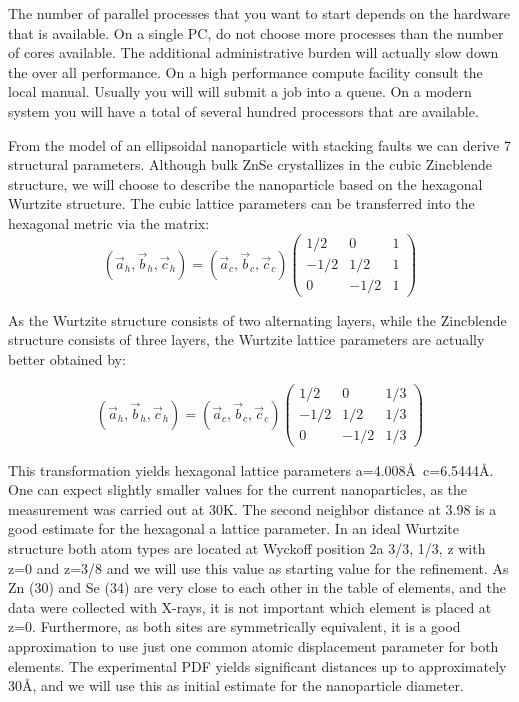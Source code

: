 The number of parallel processes that you want to start depends on the 
hardware that is available. On a single PC, do not choose more processes than
the number of cores available. The additional administrative burden will 
actually slow down the over all performance. On a high performance compute 
facility consult the local manual. Usually you will will submit a job into 
a queue. On a modern system you will have a total of several hundred 
processors that are available.

From the model of an ellipsoidal nanoparticle with stacking faults we can
derive 7 structural parameters. Although bulk ZnSe crystallizes in the
cubic Zincblende structure, we will choose to describe the nanoparticle 
based on the hexagonal Wurtzite structure. The cubic lattice parameters can
be transferred into the hexagonal metric via the matrix:
\begin{equation}
  ( \vec{a}_h, \vec{b}_h,\vec{c}_h ) = \left ( \vec{a}_c, \vec{b}_c, \vec{c}_c  \right )
   \left ( \begin{array}{rrr} 1/2 & 0   &1 \\ -1/2 &1/2 &1 \\ 0 &-1/2 &1 \end{array} \right )
\end{equation}

As the Wurtzite structure consists of two alternating layers, while the 
Zincblende structure consists of three layers, the Wurtzite lattice parameters
are actually better obtained by:

\begin{equation}
  ( \vec{a}_h, \vec{b}_h,\vec{c}_h ) = \left ( \vec{a}_c, \vec{b}_c, \vec{c}_c  \right )
   \left ( \begin{array}{rrr} 1/2 & 0   &1/3 \\ -1/2 &1/2 &1/3 \\ 0 &-1/2 &1/3 \end{array} \right )
\end{equation}

This transformation yields hexagonal lattice parameters a=4.008\AA\ c=6.5444\AA. One can 
expect slightly smaller values for the current nanoparticles, as the measurement 
was carried out at 30K. The second neighbor distance at 3.98 is a good estimate 
for the hexagonal a lattice parameter. In an ideal Wurtzite structure both atom
types are located at Wyckoff position 2a 3/3, 1/3, z with z=0 and z=3/8 and we 
will use this value as starting value for the refinement. As Zn (30) and Se (34) 
are very close to each other in the table of elements, and the data were collected
with X-rays, it is not important which element is placed at z=0. Furthermore, as
both sites are symmetrically equivalent, it is a good approximation to use just 
one common atomic displacement parameter for both elements. The experimental PDF
yields significant distances up to approximately 30\AA, and we will use this as
initial estimate for the nanoparticle diameter.

